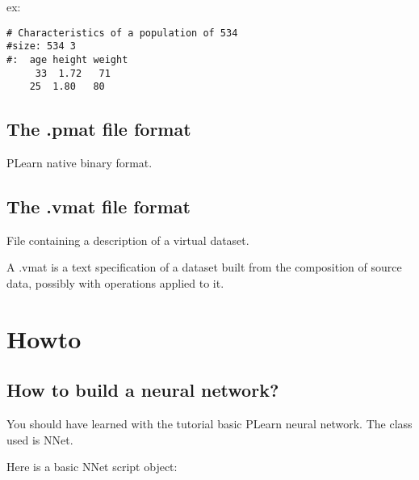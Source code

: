 \documentclass[11pt]{book}
\begin{document}
ex:

\begin{verbatim}
# Characteristics of a population of 534
#size: 534 3
#:  age height weight
     33  1.72   71
    25  1.80   80
\end{verbatim}

\section{The .pmat file format}

PLearn native binary format.

\section{The .vmat file format}

File containing a description of a virtual dataset.

A .vmat is a text specification of a dataset built from the composition of source data, possibly with operations applied to it.

 


% 


\chapter{Howto}

\section{How to build a neural network?}

You should have learned with the tutorial basic PLearn neural network. The class used is NNet.

Here is a basic NNet script object:
\end{document}
